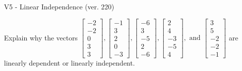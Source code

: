 \begin{exercise}
  \begin{exerciseTitle}V5 - Linear Independence (ver. 220)\end{exerciseTitle}
  \begin{exerciseStatement}
    Explain why the vectors \(\left[\begin{array}{r}
-2 \\
-2 \\
0 \\
3 \\
3
\end{array}\right] , \left[\begin{array}{r}
-1 \\
3 \\
2 \\
0 \\
-3
\end{array}\right] , \left[\begin{array}{r}
-6 \\
3 \\
-5 \\
2 \\
-6
\end{array}\right] , \left[\begin{array}{r}
2 \\
4 \\
-3 \\
-5 \\
4
\end{array}\right] , \text{ and } \left[\begin{array}{r}
3 \\
5 \\
-2 \\
-2 \\
-1
\end{array}\right]\) are linearly dependent or linearly independent.	



\end{exerciseStatement}
\end{exercise}
